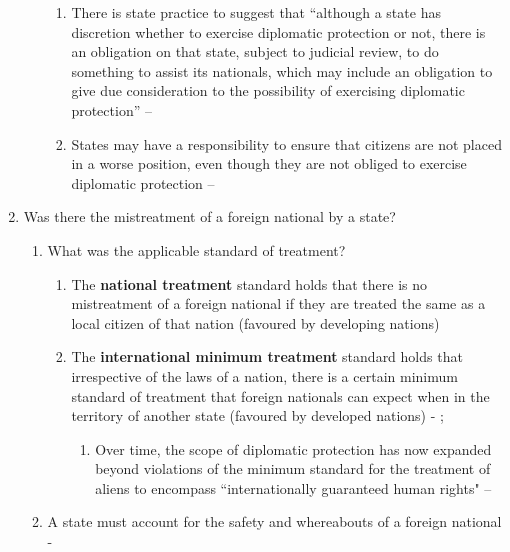\begin{enumerate}
\begin{enumerate}
\begin{enumerate}
            \item There is state practice to suggest that ``although a state has discretion whether to exercise diplomatic protection or not, there is an obligation on that state, subject to judicial review, to do something to assist its nationals, which may include an obligation to give due consideration to the possibility of exercising diplomatic protection'' -- 
            \item States may have a responsibility to ensure that citizens are not placed in a worse position, even though they are not obliged to exercise diplomatic protection -- 
        \end{enumerate}
    \end{enumerate}
    \item Was there the mistreatment of a foreign national by a state?
    \begin{enumerate}
        \item What was the applicable standard of treatment?
        \begin{enumerate}
            \item The \textbf{national treatment} standard holds that there is no mistreatment of a foreign national if they are treated the same as a local citizen of that nation (favoured by developing nations)
            \item The \textbf{international minimum treatment} standard holds that irrespective of the laws of a nation, there is a certain minimum standard of treatment that foreign nationals can expect when in the territory of another state (favoured by developed nations) - ; 
            \begin{enumerate}
                \item Over time, the scope of diplomatic protection has now expanded beyond violations of the minimum standard for the treatment of aliens to encompass ``internationally guaranteed human rights" -- 
            \end{enumerate}
        \end{enumerate}
        \item A state must account for the safety and whereabouts of a foreign national - 

\end{enumerate}
\end{enumerate}
